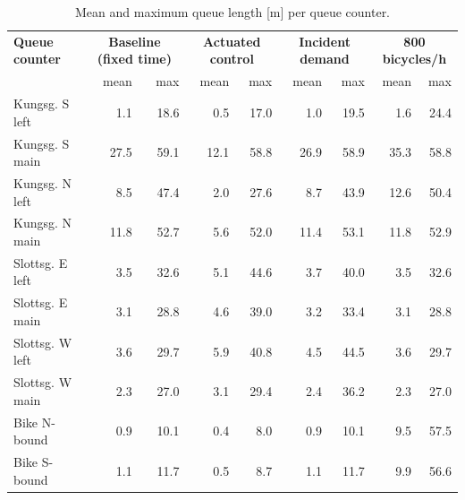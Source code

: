 \begin{table}[H]
\centering
\caption{Mean and maximum queue length [m] per queue counter.}
\label{tab:altqueue}
\small
\begin{tabular}{lrrrrrrrr}
\toprule
\textbf{Queue counter} & \multicolumn{2}{c}{\textbf{Baseline (fixed time)}} & \multicolumn{2}{c}{\textbf{Actuated control}} & \multicolumn{2}{c}{\textbf{Incident demand}} & \multicolumn{2}{c}{\textbf{800 bicycles/h}}\\
 & mean & max & mean & max & mean & max & mean & max\\
\midrule
Kungsg. S left & 1.1 & 18.6 & 0.5 & 17.0 & 1.0 & 19.5 & 1.6 & 24.4\\
Kungsg. S main & 27.5 & 59.1 & 12.1 & 58.8 & 26.9 & 58.9 & 35.3 & 58.8\\
Kungsg. N left & 8.5 & 47.4 & 2.0 & 27.6 & 8.7 & 43.9 & 12.6 & 50.4\\
Kungsg. N main & 11.8 & 52.7 & 5.6 & 52.0 & 11.4 & 53.1 & 11.8 & 52.9\\
Slottsg. E left & 3.5 & 32.6 & 5.1 & 44.6 & 3.7 & 40.0 & 3.5 & 32.6\\
Slottsg. E main & 3.1 & 28.8 & 4.6 & 39.0 & 3.2 & 33.4 & 3.1 & 28.8\\
Slottsg. W left & 3.6 & 29.7 & 5.9 & 40.8 & 4.5 & 44.5 & 3.6 & 29.7\\
Slottsg. W main & 2.3 & 27.0 & 3.1 & 29.4 & 2.4 & 36.2 & 2.3 & 27.0\\
Bike N-bound & 0.9 & 10.1 & 0.4 & 8.0 & 0.9 & 10.1 & 9.5 & 57.5\\
Bike S-bound & 1.1 & 11.7 & 0.5 & 8.7 & 1.1 & 11.7 & 9.9 & 56.6\\
\bottomrule
\end{tabular}
\end{table}

